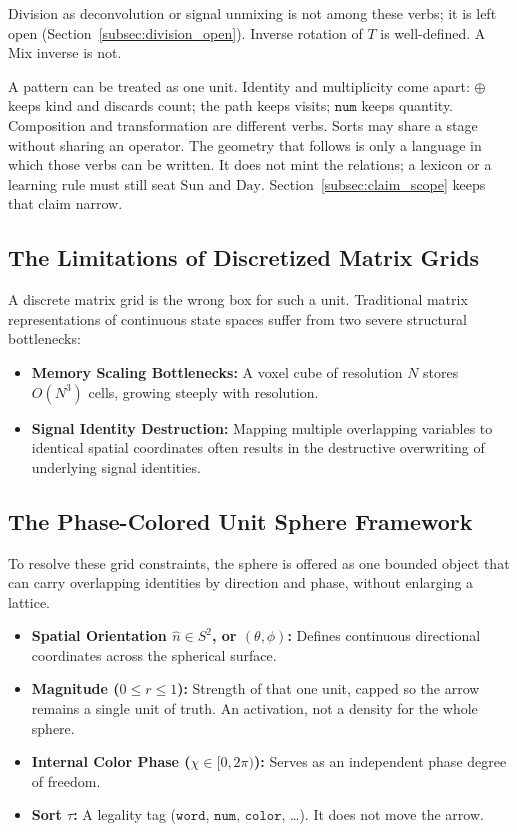 \documentclass[12pt, a4paper]{article}
\begin{document}
Division as deconvolution or signal unmixing is not among these
verbs; it is left open
(Section~\ref{subsec:division_open}).
Inverse rotation of $T$ is well-defined. A Mix inverse is not.

A pattern can be treated as one unit. Identity and multiplicity come
apart: $\oplus$ keeps kind and discards count; the path keeps visits;
$\mathtt{num}$ keeps quantity. Composition and transformation are
different verbs. Sorts may share a stage without sharing an operator.
The geometry that follows is only a language in which those verbs can
be written. It does not mint the relations; a lexicon or a learning
rule must still seat $\mathrm{Sun}$ and $\mathrm{Day}$.
Section~\ref{subsec:claim_scope} keeps that claim narrow.

\subsection{The Limitations of Discretized Matrix Grids}
A discrete matrix grid is the wrong box for such a unit. Traditional matrix representations of continuous state spaces suffer from two severe structural bottlenecks:
\begin{itemize}
    \item \textbf{Memory Scaling Bottlenecks:} A voxel cube of resolution $N$ stores $O(N^3)$ cells, growing steeply with resolution.
    \item \textbf{Signal Identity Destruction:} Mapping multiple overlapping variables to identical spatial coordinates often results in the destructive overwriting of underlying signal identities.
\end{itemize}

\subsection{The Phase-Colored Unit Sphere Framework}
To resolve these grid constraints, the sphere is offered as one bounded object that can carry overlapping identities by direction and phase, without enlarging a lattice.
\begin{itemize}
    \item \textbf{Spatial Orientation $\hat n \in S^2$, or $(\theta, \phi)$:} Defines continuous directional coordinates across the spherical surface.
    \item \textbf{Magnitude ($0 \leq r \leq 1$):} Strength of that one unit, capped so the arrow remains a single unit of truth. An activation, not a density for the whole sphere.
    \item \textbf{Internal Color Phase ($\chi \in [0, 2\pi)$):} Serves as an independent phase degree of freedom.
    \item \textbf{Sort $\tau$:} A legality tag ($\mathtt{word}$, $\mathtt{num}$, $\mathtt{color}$, \ldots). It does not move the arrow.
\end{itemize}
\end{document}

